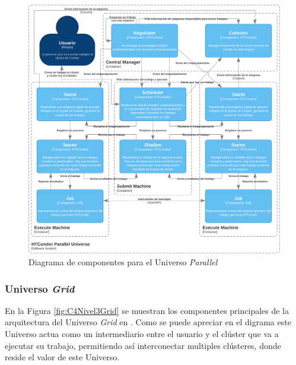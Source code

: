 \begin{figure}[H]
	\centering
	\includegraphics[scale=0.09]{tablas-images/C4/Diagramas HTCondor-Nivel 3 - Parallel.drawio.png}
	\caption{Diagrama de componentes para el Universo \textit{Parallel}}
    \label{fig:C4Nivel3Parallel}
\end{figure}

\subsubsection{Universo \textit{Grid}}
\noindent
En la Figura \ref{fig:C4Nivel3Grid} se muestran los componentes principales de la arquitectura del Universo \textit{Grid} en \HTCondor. Como se puede apreciar en el digrama este Universo actua como un intermediario entre el usuario y el clúster que va a ejecutar su trabajo, permitiendo así interconectar multiples clústeres, donde reside el valor de este Universo.

